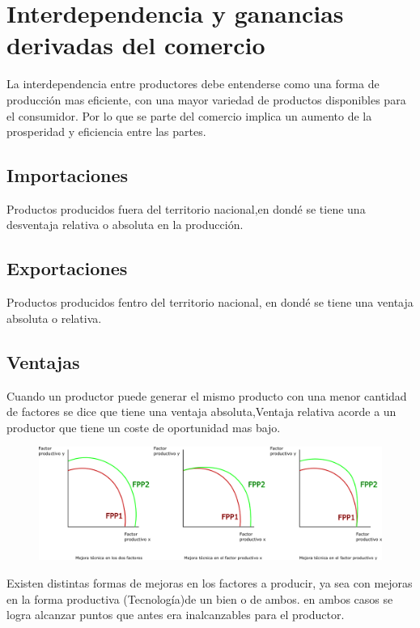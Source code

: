 \newpage

\section{Interdependencia y ganancias derivadas del comercio} La interdependencia entre productores debe entenderse como una forma de producción mas eficiente, con una mayor variedad de productos disponibles para el consumidor. Por lo que se parte del comercio implica un aumento de la prosperidad y eficiencia entre las partes. 
\subsection{Importaciones} Productos producidos fuera del territorio nacional,en dondé se tiene una desventaja relativa o absoluta en la producción. 
\subsection{Exportaciones} Productos producidos fentro del territorio nacional, en dondé se tiene una ventaja absoluta o relativa.  
\subsection{Ventajas} Cuando un productor puede generar el mismo producto con una menor cantidad de factores se dice que tiene una ventaja absoluta,Ventaja relativa acorde a un productor que tiene un coste de oportunidad mas bajo.

\begin{figure}[h]
\includegraphics[scale=0.3]{images/Desplazamientos_en_la_FPP.png}
\end{figure}
Existen distintas formas de mejoras en los factores a producir, ya sea con mejoras en la forma productiva (Tecnología)de un bien o de ambos. en ambos casos se logra alcanzar puntos que antes era inalcanzables para el productor.

